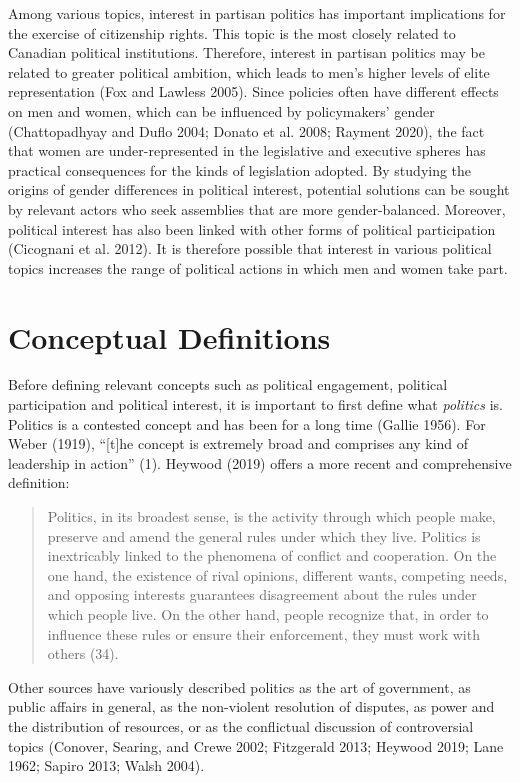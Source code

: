 \documentclass[
  letterpaper,
  DIV=11,
  numbers=noendperiod]{scrreprt}
\begin{document}
Among various topics, interest in partisan politics has important
implications for the exercise of citizenship rights. This topic is the
most closely related to Canadian political institutions. Therefore,
interest in partisan politics may be related to greater political
ambition, which leads to men's higher levels of elite representation
(Fox and Lawless 2005). Since policies often have different effects on
men and women, which can be influenced by policymakers' gender
(Chattopadhyay and Duflo 2004; Donato et al. 2008; Rayment 2020), the
fact that women are under-represented in the legislative and executive
spheres has practical consequences for the kinds of legislation adopted.
By studying the origins of gender differences in political interest,
potential solutions can be sought by relevant actors who seek assemblies
that are more gender-balanced. Moreover, political interest has also
been linked with other forms of political participation (Cicognani et
al. 2012). It is therefore possible that interest in various political
topics increases the range of political actions in which men and women
take part.

\section{Conceptual Definitions}\label{conceptual-definitions}

Before defining relevant concepts such as political engagement,
political participation and political interest, it is important to first
define what \emph{politics} is. Politics is a contested concept and has
been for a long time (Gallie 1956). For Weber (1919), ``{[}t{]}he
concept is extremely broad and comprises any kind of leadership in
action'' (1). Heywood (2019) offers a more recent and comprehensive
definition:

\begin{quote}
Politics, in its broadest sense, is the activity through which people
make, preserve and amend the general rules under which they live.
Politics is inextricably linked to the phenomena of conflict and
cooperation. On the one hand, the existence of rival opinions, different
wants, competing needs, and opposing interests guarantees disagreement
about the rules under which people live. On the other hand, people
recognize that, in order to influence these rules or ensure their
enforcement, they must work with others (34).
\end{quote}

Other sources have variously described politics as the art of
government, as public affairs in general, as the non-violent resolution
of disputes, as power and the distribution of resources, or as the
conflictual discussion of controversial topics (Conover, Searing, and
Crewe 2002; Fitzgerald 2013; Heywood 2019; Lane 1962; Sapiro 2013; Walsh
2004).
\end{document}
